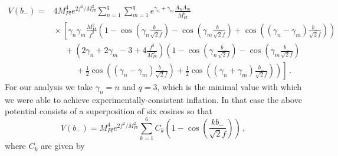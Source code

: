 \documentclass[12pt]{article}
\begin{document}
\cite{Nath:2017ihp}
\begin{equation} \label{eq:supergravity:Vslow}
  \begin{aligned}
    V\left(b_-\right) =
      & 4 M_{Pl}^4 e^{2 f^2 / M_{Pl}^2} \sum_{n = 1}^q \sum_{m = 1}^q
        e^{\gamma_n + \gamma_m} \frac{A_n A_m}{M_{Pl}^6}\\
        &{} \times \left[
          \gamma_n \gamma_m \frac{M_{Pl}^2}{f^2} \left(
              1
            - \cos\left(\gamma_n \frac{b_-}{\sqrt{2} f}\right)
            - \cos\left(\gamma_m \frac{b_-}{\sqrt{2} f}\right)
            + \cos\left(\left(\gamma_n - \gamma_m\right) \frac{b_-}{\sqrt{2} f}\right)
          \right)\right.\\
          &~~~~~~ + \left(2 \gamma_n + 2 \gamma_m - 3 + 4 \frac{f^2}{M_{Pl}^2}\right) \left(
              1
            - \cos\left(\gamma_n \frac{b_-}{\sqrt{2} f}\right)
            - \cos\left(\gamma_m \frac{b_-}{\sqrt{2} f}\right)\right.\\
            &~~~~~~~~~~~~ \left.\left.{}
            + \frac{1}{2} \cos\left(\left(\gamma_n - \gamma_m\right) \frac{b_-}{\sqrt{2} f}\right)
            + \frac{1}{2} \cos\left(\left(\gamma_n + \gamma_m\right) \frac{b_-}{\sqrt{2} f}\right)
          \right)
        \right]\,.
  \end{aligned}
\end{equation}
For our analysis we take $\gamma_n = n$ and $q = 3$, which is the minimal value with which we were able to achieve experimentally-consistent inflation.
In that case the above potential consists of a superposition of six cosines so that
\begin{equation} \label{eq:supergravity:Vslow3}
  V\left(b_-\right)
    = M_{Pl}^4 e^{2 f^2 / M_{Pl}^2} \sum_{k = 1}^6 C_k \left(1 - \cos\left(\frac{k b_-}{\sqrt{2} f}\right)\right)\,,
\end{equation}
where $C_k$ are given by
\end{document}
